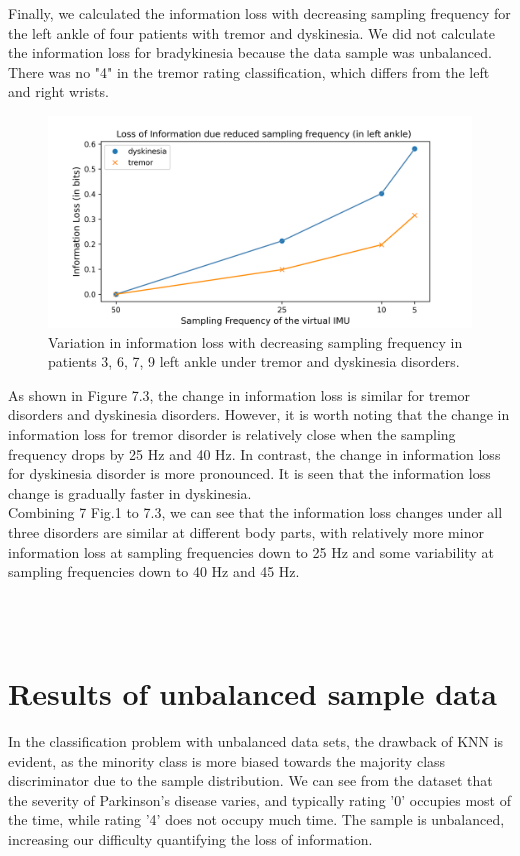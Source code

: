Finally, we calculated the information loss with decreasing sampling frequency for the left ankle of four patients with tremor and dyskinesia. We did not calculate the information loss for bradykinesia because the data sample was unbalanced. There was no "4" in the tremor rating classification, which differs from the left and right wrists.\\
\begin{figure}[htbp]
\centering
\includegraphics[width=13cm ]{report/pics/7.3.png}
\caption{Variation in information loss with decreasing sampling frequency in patients 3, 6, 7, 9 left ankle under tremor and dyskinesia disorders.}
\end{figure}
As shown in Figure 7.3, the change in information loss is similar for tremor disorders and dyskinesia disorders. However, it is worth noting that the change in information loss for tremor disorder is relatively close when the sampling frequency drops by 25 Hz and 40 Hz. In contrast, the change in information loss for dyskinesia disorder is more pronounced. It is seen that the information loss change is gradually faster in dyskinesia. \\
Combining 7 Fig.1 to 7.3, we can see that the information loss changes under all three disorders are similar at different body parts, with relatively more minor information loss at sampling frequencies down to 25 Hz and some variability at sampling frequencies down to 40 Hz and 45 Hz.


\\ \hspace*{\fill} \\
\section{Results of unbalanced sample data}
In the classification problem with unbalanced data sets, the drawback of KNN is evident, as the minority class is more biased towards the majority class discriminator due to the sample distribution. We can see from the dataset that the severity of Parkinson's disease varies, and typically rating '0' occupies most of the time, while rating '4' does not occupy much time. The sample is unbalanced, increasing our difficulty quantifying the loss of information.\\

